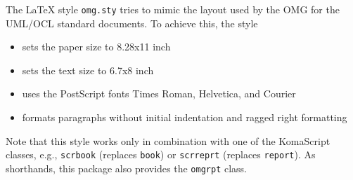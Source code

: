 \documentclass{omgrpt}
\begin{document}
\label{sec:ocl-1:introduction}
The \LaTeX{} style \texttt{omg.sty} tries to mimic the layout used by
the OMG for the UML/OCL standard documents. To achieve this, the style
\begin{itemize}
\item sets the paper size to 8.28x11 inch
\item sets the text size to 6.7x8 inch
\item uses the PostScript fonts Times Roman, Helvetica, and Courier
\item formats paragraphs without initial indentation and ragged 
  right formatting
\end{itemize}
Note that this style works only in combination with one of the
KomaScript classes, e.g., \texttt{scrbook} (replaces \texttt{book}) or 
\texttt{scrreprt} (replaces \texttt{report}). As shorthands, this
package also provides the \texttt{omgrpt} class.
\end{document}
